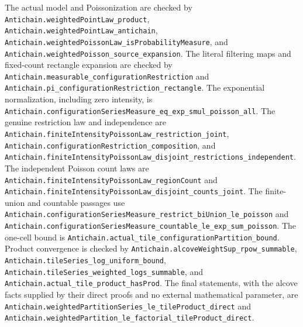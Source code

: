 \begingroup\small\raggedright
The actual model and Poissonization are checked by
\nolinkurl{Antichain.weightedPointLaw_product},
\nolinkurl{Antichain.weightedPointLaw_antichain},
\nolinkurl{Antichain.weightedPoissonLaw_isProbabilityMeasure}, and
\nolinkurl{Antichain.weightedPoisson_source_expansion}.
The literal filtering maps and fixed-count rectangle expansion are checked by
\nolinkurl{Antichain.measurable_configurationRestriction} and
\nolinkurl{Antichain.pi_configurationRestriction_rectangle}.
The exponential normalization, including zero intensity, is
\nolinkurl{Antichain.configurationSeriesMeasure_eq_exp_smul_poisson_all}.
The genuine restriction law and independence are
\nolinkurl{Antichain.finiteIntensityPoissonLaw_restriction_joint},
\nolinkurl{Antichain.configurationRestriction_composition}, and
\nolinkurl{Antichain.finiteIntensityPoissonLaw_disjoint_restrictions_independent}.
The independent Poisson count laws are
\nolinkurl{Antichain.finiteIntensityPoissonLaw_regionCount} and
\nolinkurl{Antichain.finiteIntensityPoissonLaw_disjoint_counts_joint}.
The finite-union and countable passages use
\nolinkurl{Antichain.configurationSeriesMeasure_restrict_biUnion_le_poisson} and
\nolinkurl{Antichain.configurationSeriesMeasure_countable_le_exp_sum_poisson}.
The one-cell bound is
\nolinkurl{Antichain.actual_tile_configurationPartition_bound}.
Product convergence is checked by
\nolinkurl{Antichain.alcoveWeightSup_rpow_summable},
\nolinkurl{Antichain.tileSeries_log_uniform_bound},
\nolinkurl{Antichain.tileSeries_weighted_logs_summable}, and
\nolinkurl{Antichain.actual_tile_product_hasProd}.
The final statements, with the alcove facts supplied by their direct
proofs and no external mathematical parameter, are
\nolinkurl{Antichain.weightedPartitionSeries_le_tileProduct_direct} and
\nolinkurl{Antichain.weightedPartition_le_factorial_tileProduct_direct}.
\par\endgroup

